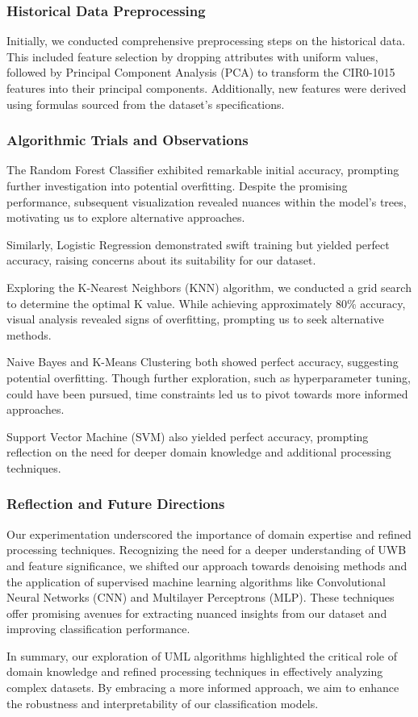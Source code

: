 \subsubsection{Historical Data Preprocessing}

Initially, we conducted comprehensive preprocessing steps on the historical data. This included feature selection by dropping attributes with uniform values, followed by Principal Component Analysis (PCA) to transform the CIR0-1015 features into their principal components. Additionally, new features were derived using formulas sourced from the dataset's specifications.

\subsubsection{Algorithmic Trials and Observations}

The Random Forest Classifier exhibited remarkable initial accuracy, prompting further investigation into potential overfitting. Despite the promising performance, subsequent visualization revealed nuances within the model's trees, motivating us to explore alternative approaches.

Similarly, Logistic Regression demonstrated swift training but yielded perfect accuracy, raising concerns about its suitability for our dataset.

Exploring the K-Nearest Neighbors (KNN) algorithm, we conducted a grid search to determine the optimal K value. While achieving approximately 80\% accuracy, visual analysis revealed signs of overfitting, prompting us to seek alternative methods.

Naive Bayes and K-Means Clustering both showed perfect accuracy, suggesting potential overfitting. Though further exploration, such as hyperparameter tuning, could have been pursued, time constraints led us to pivot towards more informed approaches.

Support Vector Machine (SVM) also yielded perfect accuracy, prompting reflection on the need for deeper domain knowledge and additional processing techniques.

\subsubsection{Reflection and Future Directions}

Our experimentation underscored the importance of domain expertise and refined processing techniques. Recognizing the need for a deeper understanding of UWB and feature significance, we shifted our approach towards denoising methods and the application of supervised machine learning algorithms like Convolutional Neural Networks (CNN) and Multilayer Perceptrons (MLP). These techniques offer promising avenues for extracting nuanced insights from our dataset and improving classification performance.

In summary, our exploration of UML algorithms highlighted the critical role of domain knowledge and refined processing techniques in effectively analyzing complex datasets. By embracing a more informed approach, we aim to enhance the robustness and interpretability of our classification models.
